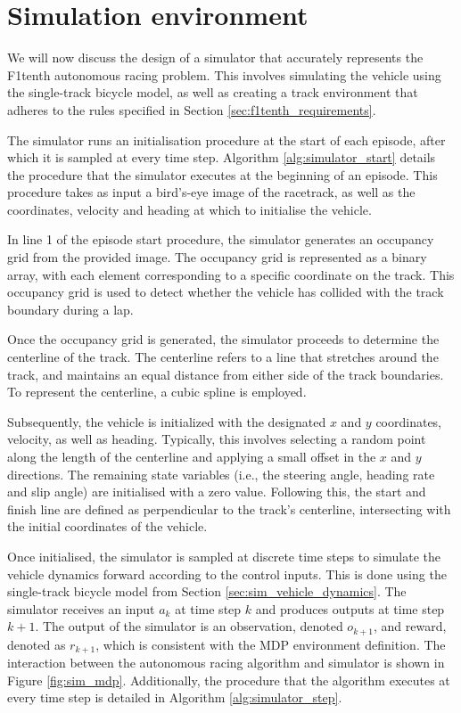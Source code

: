 \section{Simulation environment}

We will now discuss the design of a simulator that accurately represents the F1tenth autonomous racing problem. 
This involves simulating the vehicle using the single-track bicycle model, as well as creating a track environment that adheres to the rules specified in Section \ref{sec:f1tenth_requirements}. 


The simulator runs an initialisation procedure at the start of each episode, after which it is sampled at every time step.
Algorithm \ref{alg:simulator_start} details the procedure that the simulator executes at the beginning of an episode.
This procedure takes as input a bird's-eye image of the racetrack, as well as the coordinates, velocity and heading at which to initialise the vehicle. 

In line 1 of the episode start procedure, the simulator generates an occupancy grid from the provided image. 
The occupancy grid is represented as a binary array, with each element corresponding to a specific coordinate on the track. 
This occupancy grid is used to detect whether the vehicle has collided with the track boundary during a lap.



Once the occupancy grid is generated, the simulator proceeds to determine the centerline of the track. 
The centerline refers to a line that stretches around the track, and maintains an equal distance from either side of the track boundaries. 
To represent the centerline, a cubic spline \cite{Sakai2018} is employed.

Subsequently, the vehicle is initialized with the designated $x$ and $y$ coordinates, velocity, as well as heading.
Typically, this involves selecting a random point along the length of the centerline and applying a small offset in the $x$ and $y$ directions. 
The remaining state variables (i.e., the steering angle, heading rate and slip angle) are initialised with a zero value.
Following this, the start and finish line are defined as perpendicular to the track's centerline, intersecting with the initial coordinates of the vehicle.


Once initialised, the simulator is sampled at discrete time steps to simulate the vehicle dynamics forward according to the control inputs.
This is done using the single-track bicycle model from Section \ref{sec:sim_vehicle_dynamics}.
The simulator receives an input $a_{k}$ at time step $k$ and produces outputs at time step $k+1$.
The output of the simulator is an observation, denoted $o_{k+1}$, and reward, denoted as $r_{k+1}$, which is consistent with the MDP environment definition.
The interaction between the autonomous racing algorithm and simulator is shown in Figure \ref{fig:sim_mdp}.
Additionally, the procedure that the algorithm executes at every time step is detailed in Algorithm \ref{alg:simulator_step}.

